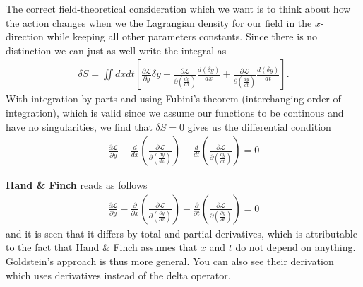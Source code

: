 \documentclass[a4paper]{article}
\begin{document}
    The correct field-theoretical consideration which we want is to think about how the action changes when we the Lagrangian density for our field in the \(x\)-direction while keeping all other parameters constants. Since there is no distinction we can just as well write the integral as \begin{align*}
        \delta S = \iint dx dt \left[ \frac{\partial \mathcal{L}}{\partial y} \delta y + \frac{\partial \mathcal{L}}{\partial \left( \frac{d y}{d x}  \right)}\frac{d (\delta y)}{d x} + \frac{\partial \mathcal{L}}{\partial \left( \frac{d y}{d t}  \right)}\frac{d (\delta y)}{d t}  \right].
    \end{align*} 
    With integration by parts and using Fubini's theorem (interchanging order of integration), which is valid since we assume our functions to be continous and have no singularities, we find that \(\delta S = 0\) gives us the differential condition
      \begin{align*}
        \frac{\partial \mathcal{L} }{\partial y} - \frac{d}{d x}\left( \frac{\partial \mathcal{L} }{\partial \left( \frac{d y}{d x}  \right) }  \right) - \frac{d}{d t}\left( \frac{\partial \mathcal{L} }{\partial \left( \frac{d y}{d t}  \right) }  \right) = 0
    \end{align*}

    \textbf{Hand \& Finch} reads as follows \begin{align*}
        \frac{\partial \mathcal{L} }{\partial y} - \frac{\partial}{\partial x}\left( \frac{\partial \mathcal{L} }{\partial \left( \frac{\partial y}{\partial x}  \right) }  \right) - \frac{\partial}{\partial t}\left( \frac{\partial \mathcal{L} }{\partial \left( \frac{\partial y}{\partial t}  \right) }  \right) = 0
    \end{align*}
    and it is seen that it differs by total and partial derivatives, which is attributable to the fact that Hand \& Finch assumes that \(x\) and \(t\) do not depend on anything. Goldstein's approach is thus more general. You can also see their derivation which uses derivatives instead of the delta operator.
    
\end{document}
